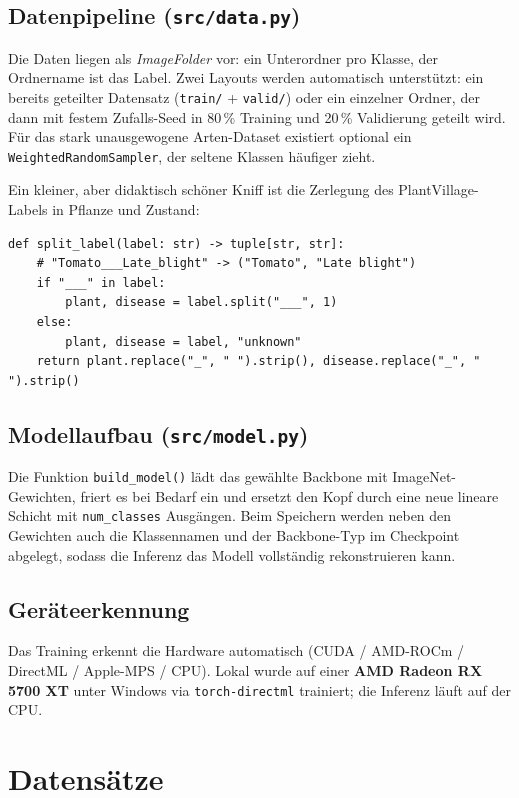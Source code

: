 \documentclass[11pt,a4paper]{article}
\begin{document}
\subsection{Datenpipeline (\texttt{src/data.py})}
Die Daten liegen als \emph{ImageFolder} vor: ein Unterordner pro Klasse, der
Ordnername ist das Label. Zwei Layouts werden automatisch unterstützt:
ein bereits geteilter Datensatz (\texttt{train/} + \texttt{valid/}) oder ein
einzelner Ordner, der dann mit festem Zufalls-Seed in 80\,\% Training und
20\,\% Validierung geteilt wird. Für das stark unausgewogene Arten-Dataset
existiert optional ein \texttt{WeightedRandomSampler}, der seltene Klassen
häufiger zieht.

Ein kleiner, aber didaktisch schöner Kniff ist die Zerlegung des
PlantVillage-Labels in Pflanze und Zustand:
\begin{lstlisting}[caption={Label-Split in Pflanze und Krankheit (\texttt{src/data.py})}]
def split_label(label: str) -> tuple[str, str]:
    # "Tomato___Late_blight" -> ("Tomato", "Late blight")
    if "___" in label:
        plant, disease = label.split("___", 1)
    else:
        plant, disease = label, "unknown"
    return plant.replace("_", " ").strip(), disease.replace("_", " ").strip()
\end{lstlisting}

\subsection{Modellaufbau (\texttt{src/model.py})}
Die Funktion \texttt{build\_model()} lädt das gewählte Backbone mit
ImageNet-Gewichten, friert es bei Bedarf ein und ersetzt den Kopf durch eine
neue lineare Schicht mit \texttt{num\_classes} Ausgängen. Beim Speichern werden
neben den Gewichten auch die Klassennamen und der Backbone-Typ im Checkpoint
abgelegt, sodass die Inferenz das Modell vollständig rekonstruieren kann.

\subsection{Geräteerkennung}
Das Training erkennt die Hardware automatisch (CUDA / AMD-ROCm / DirectML /
Apple-MPS / CPU). Lokal wurde auf einer \textbf{AMD Radeon RX 5700 XT} unter
Windows via \texttt{torch-directml} trainiert; die Inferenz läuft auf der CPU.

\section{Datensätze}
\end{document}

